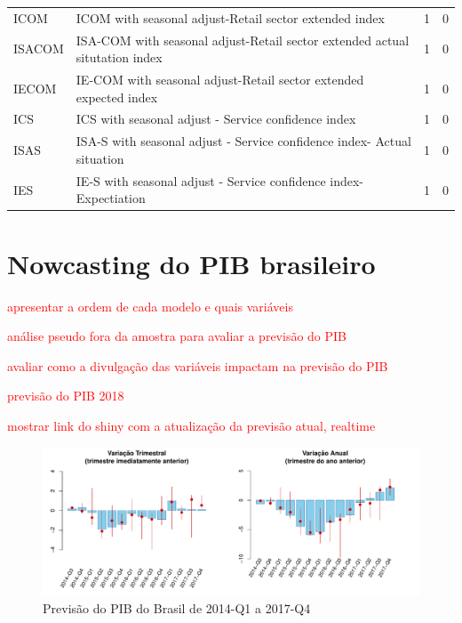 \documentclass{article}
\begin{document}
\begin{landscape}
\begin{center}
\begin{longtable}{|l|l|l|l|}
ICOM & ICOM with seasonal adjust-Retail sector extended index & 1 & 0 \\
ISACOM & ISA-COM with seasonal adjust-Retail sector extended actual situtation index & 1 & 0 \\
IECOM & IE-COM with seasonal adjust-Retail sector extended expected index & 1 & 0 \\
ICS & ICS with seasonal adjust - Service confidence index & 1 & 0 \\
ISAS & ISA-S with seasonal adjust - Service confidence index- Actual situation & 1 & 0 \\
IES & IE-S with seasonal adjust - Service confidence index- Expectiation & 1 & 0 \\

\end{longtable}
\end{center}
\end{landscape}


\section{Nowcasting do PIB brasileiro}\label{nowcastingBR}

\textcolor{red}{apresentar a ordem de cada modelo e quais variáveis}

\textcolor{red}{análise pseudo fora da amostra para avaliar a previsão do PIB}

\textcolor{red}{avaliar como a divulgação das variáveis impactam na previsão do PIB}

\textcolor{red}{previsão do PIB 2018}

\textcolor{red}{mostrar link do shiny com a atualização da previsão atual, realtime}

\begin{figure}[h]
  \centering
  \includegraphics[width=1\textwidth]{fcst3anos_variacoes} %
  \caption{Previsão do PIB do Brasil de 2014-Q1 a 2017-Q4}
  \label{fcst_variacoes}
\end{figure}
\end{document}

